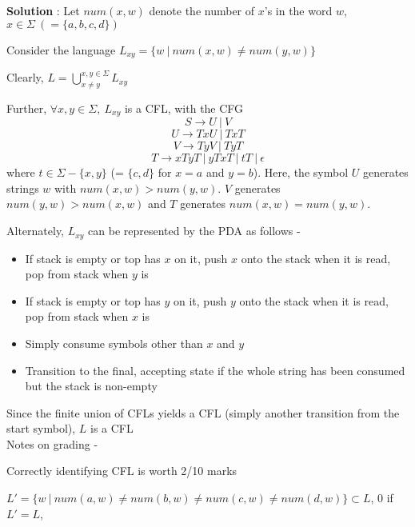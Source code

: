 \documentclass{article}
\begin{document}
    \textbf{Solution} : Let $num(x, w)$ denote the number of $x$'s in the word $w$, $x \in \Sigma ~(= \{ a, b, c, d\})$
    
    Consider the language $L_{xy} = \{w ~|~ num(x, w) \neq num(y, w) \}$
    
    Clearly, $L = \bigcup_{x \neq y}^{x, y \in \Sigma}L_{xy}$
    
    Further, $\forall x, y \in \Sigma, ~L_{xy}$ is a CFL, with the CFG
    $$S \rightarrow U ~|~ V$$
    $$U \rightarrow TxU ~|~ TxT$$
    $$V \rightarrow TyV ~|~ TyT$$
    $$T \rightarrow xTyT ~|~ yTxT ~|~ tT ~|~ \epsilon $$
    where $t \in \Sigma - \{x, y\}$ (= $\{c, d\}$ for $x = a$ and $y= b$). Here, the symbol $U$ generates strings $w$ with $num(x, w) > num(y, w)$. $V$ generates $num(y, w) > num(x, w)$ and $T$ generates $num(x, w) = num(y, w)$. 
    
    Alternately, $L_{xy}$ can be represented by the PDA as follows - 
    \begin{itemize}
        \item If stack is empty or top has $x$ on it, push $x$ onto the stack when it is read, pop from stack when $y$ is
        \item If stack is empty or top has $y$ on it, push $y$ onto the stack when it is read, pop from stack when $x$ is
        \item Simply consume symbols other than $x$ and $y$
        \item Transition to the final, accepting state if the whole string has been consumed but the stack is non-empty
    \end{itemize}
    
    
    
    Since the finite union of CFLs yields a CFL (simply another transition from the start symbol), $L$ is a CFL\\
    
    Notes on grading - 
    
    Correctly identifying CFL is worth 2/10 marks
    
    $L' = \{w ~|~ num(a, w) \neq num(b, w) \neq num(c,w) \neq num(d,w) \} \subset L$, 0 if $L' = L$, 
    
\end{document}
